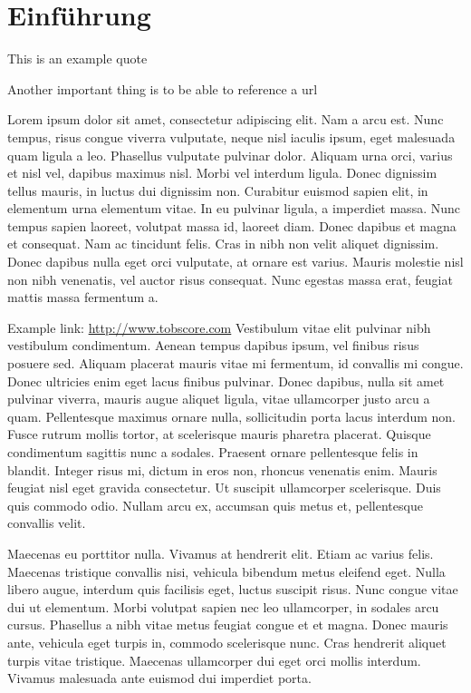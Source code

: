 \chapter{Einführung}\label{chap:intro}
This is an example quote \cite{TKerst12}

Another important thing is to be able to reference a url \cite{referenceURL}

Lorem ipsum dolor sit amet, consectetur adipiscing elit. Nam a arcu est. Nunc tempus, risus congue viverra vulputate, neque nisl iaculis ipsum, eget malesuada quam ligula a leo. Phasellus vulputate pulvinar dolor. Aliquam urna orci, varius et nisl vel, dapibus maximus nisl. Morbi vel interdum ligula. Donec dignissim tellus mauris, in luctus dui dignissim non. Curabitur euismod sapien elit, in elementum urna elementum vitae. In eu pulvinar ligula, a imperdiet massa. Nunc tempus sapien laoreet, volutpat massa id, laoreet diam. Donec dapibus et magna et consequat. Nam ac tincidunt felis. Cras in nibh non velit aliquet dignissim. Donec dapibus nulla eget orci vulputate, at ornare est varius. Mauris molestie nisl non nibh venenatis, vel auctor risus consequat. Nunc egestas massa erat, feugiat mattis massa fermentum a.

Example link: \url{http://www.tobscore.com}
Vestibulum vitae elit pulvinar nibh vestibulum condimentum. Aenean tempus dapibus ipsum, vel finibus risus posuere sed. Aliquam placerat mauris vitae mi fermentum, id convallis mi congue. Donec ultricies enim eget lacus finibus pulvinar. Donec dapibus, nulla sit amet pulvinar viverra, mauris augue aliquet ligula, vitae ullamcorper justo arcu a quam. Pellentesque maximus ornare nulla, sollicitudin porta lacus interdum non. Fusce rutrum mollis tortor, at scelerisque mauris pharetra placerat. Quisque condimentum sagittis nunc a sodales. Praesent ornare pellentesque felis in blandit. Integer risus mi, dictum in eros non, rhoncus venenatis enim. Mauris feugiat nisl eget gravida consectetur. Ut suscipit ullamcorper scelerisque. Duis quis commodo odio. Nullam arcu ex, accumsan quis metus et, pellentesque convallis velit.

Maecenas eu porttitor nulla. Vivamus at hendrerit elit. Etiam ac varius felis. Maecenas tristique convallis nisi, vehicula bibendum metus eleifend eget. Nulla libero augue, interdum quis facilisis eget, luctus suscipit risus. Nunc congue vitae dui ut elementum. Morbi volutpat sapien nec leo ullamcorper, in sodales arcu cursus. Phasellus a nibh vitae metus feugiat congue et et magna. Donec mauris ante, vehicula eget turpis in, commodo scelerisque nunc. Cras hendrerit aliquet turpis vitae tristique. Maecenas ullamcorper dui eget orci mollis interdum. Vivamus malesuada ante euismod dui imperdiet porta.

